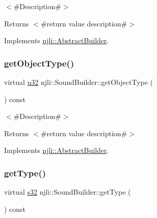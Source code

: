 $<$\#\+Description\#$>$

\begin{DoxyReturn}{Returns}
$<$\#return value description\#$>$ 
\end{DoxyReturn}


Implements \mbox{\hyperlink{classnjli_1_1_abstract_builder_a902f73ea78031b06aca183a417f3413b}{njli\+::\+Abstract\+Builder}}.

\mbox{\label{classnjli_1_1_sound_builder_ad4c84ef8bc68af39b2c5c98244b9e9a4}} 
\subsubsection{\texorpdfstring{get\+Object\+Type()}{getObjectType()}}
{\footnotesize\ttfamily virtual \mbox{\hyperlink{_util_8h_a10e94b422ef0c20dcdec20d31a1f5049}{u32}} njli\+::\+Sound\+Builder\+::get\+Object\+Type (\begin{DoxyParamCaption}{ }\end{DoxyParamCaption}) const\hspace{0.3cm}{\ttfamily [virtual]}}

$<$\#\+Description\#$>$

\begin{DoxyReturn}{Returns}
$<$\#return value description\#$>$ 
\end{DoxyReturn}


Implements \mbox{\hyperlink{classnjli_1_1_abstract_builder_a0f2d344fcf697b167f4f2b1122b5fb33}{njli\+::\+Abstract\+Builder}}.

\mbox{\label{classnjli_1_1_sound_builder_a255ff51b756b20aa40f629fa9af253d3}} 
\subsubsection{\texorpdfstring{get\+Type()}{getType()}}
{\footnotesize\ttfamily virtual \mbox{\hyperlink{_util_8h_aa62c75d314a0d1f37f79c4b73b2292e2}{s32}} njli\+::\+Sound\+Builder\+::get\+Type (\begin{DoxyParamCaption}{ }\end{DoxyParamCaption}) const\hspace{0.3cm}{\ttfamily [virtual]}}

